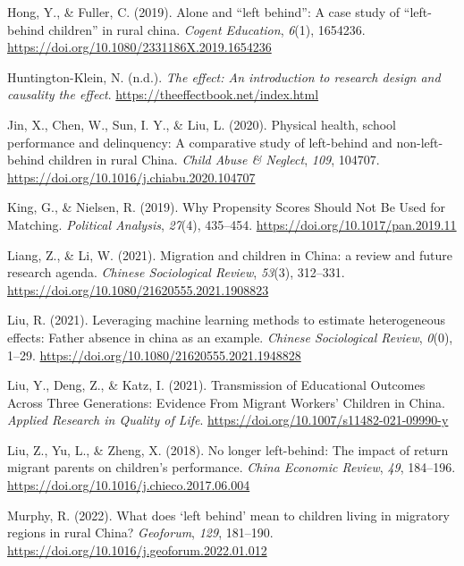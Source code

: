 \documentclass[
  man,floatsintext]{apa7}
\newlength{\cslhangindent}
\newlength{\cslentryspacingunit} %
\newenvironment{CSLReferences}[2] %
 {%
  \setlength{\parindent}{0pt}
  \ifodd #1
  \let\oldpar\par
  \def\par{\hangindent=\cslhangindent\oldpar}
  \fi
  \setlength{\parskip}{#2\cslentryspacingunit}
 }%
 {}
\begin{document}
\begin{CSLReferences}{1}{0}
\leavevmode{}%
Hong, Y., \& Fuller, C. (2019). Alone and {``}left behind{''}: A case study of {``}left-behind children{''} in rural china. \emph{Cogent Education}, \emph{6}(1), 1654236. \url{https://doi.org/10.1080/2331186X.2019.1654236}

\leavevmode{}%
Huntington-Klein, N. (n.d.). \emph{The effect: An introduction to research design and causality \textbar{} the effect}. \url{https://theeffectbook.net/index.html}

\leavevmode{}%
Jin, X., Chen, W., Sun, I. Y., \& Liu, L. (2020). Physical health, school performance and delinquency: A comparative study of left-behind and non-left-behind children in rural China. \emph{Child Abuse \& Neglect}, \emph{109}, 104707. \url{https://doi.org/10.1016/j.chiabu.2020.104707}

\leavevmode{}%
King, G., \& Nielsen, R. (2019). Why Propensity Scores Should Not Be Used for Matching. \emph{Political Analysis}, \emph{27}(4), 435--454. \url{https://doi.org/10.1017/pan.2019.11}

\leavevmode{}%
Liang, Z., \& Li, W. (2021). Migration and children in China: a review and future research agenda. \emph{Chinese Sociological Review}, \emph{53}(3), 312--331. \url{https://doi.org/10.1080/21620555.2021.1908823}

\leavevmode{}%
Liu, R. (2021). Leveraging machine learning methods to estimate heterogeneous effects: Father absence in china as an example. \emph{Chinese Sociological Review}, \emph{0}(0), 1--29. \url{https://doi.org/10.1080/21620555.2021.1948828}

\leavevmode{}%
Liu, Y., Deng, Z., \& Katz, I. (2021). Transmission of Educational Outcomes Across Three Generations: Evidence From Migrant Workers{'} Children in China. \emph{Applied Research in Quality of Life}. \url{https://doi.org/10.1007/s11482-021-09990-y}

\leavevmode{}%
Liu, Z., Yu, L., \& Zheng, X. (2018). No longer left-behind: The impact of return migrant parents on children's performance. \emph{China Economic Review}, \emph{49}, 184--196. \url{https://doi.org/10.1016/j.chieco.2017.06.004}

\leavevmode{}%
Murphy, R. (2022). What does {`}left behind{'} mean to children living in migratory regions in rural China? \emph{Geoforum}, \emph{129}, 181--190. \url{https://doi.org/10.1016/j.geoforum.2022.01.012}


\end{CSLReferences}
\end{document}
